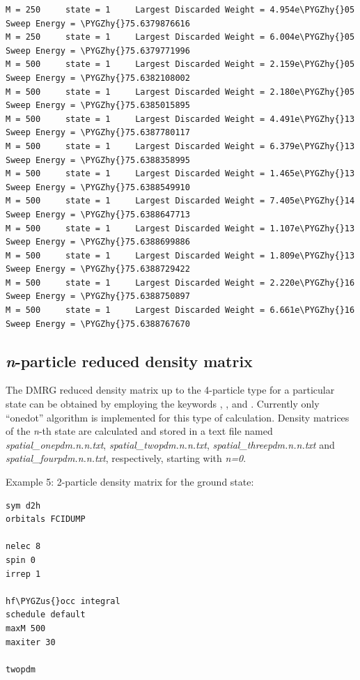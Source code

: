 \documentclass[letterpaper,10pt,english]{sphinxmanual}
\def\PYGZus{\char`\_}
\def\PYGZhy{\char`\-}
\begin{document}
\begin{Verbatim}[commandchars=\\\{\}]
M = 250     state = 1     Largest Discarded Weight = 4.954e\PYGZhy{}05  Sweep Energy = \PYGZhy{}75.6379876616
M = 250     state = 1     Largest Discarded Weight = 6.004e\PYGZhy{}05  Sweep Energy = \PYGZhy{}75.6379771996
M = 500     state = 1     Largest Discarded Weight = 2.159e\PYGZhy{}05  Sweep Energy = \PYGZhy{}75.6382108002
M = 500     state = 1     Largest Discarded Weight = 2.180e\PYGZhy{}05  Sweep Energy = \PYGZhy{}75.6385015895
M = 500     state = 1     Largest Discarded Weight = 4.491e\PYGZhy{}13  Sweep Energy = \PYGZhy{}75.6387780117
M = 500     state = 1     Largest Discarded Weight = 6.379e\PYGZhy{}13  Sweep Energy = \PYGZhy{}75.6388358995
M = 500     state = 1     Largest Discarded Weight = 1.465e\PYGZhy{}13  Sweep Energy = \PYGZhy{}75.6388549910
M = 500     state = 1     Largest Discarded Weight = 7.405e\PYGZhy{}14  Sweep Energy = \PYGZhy{}75.6388647713
M = 500     state = 1     Largest Discarded Weight = 1.107e\PYGZhy{}13  Sweep Energy = \PYGZhy{}75.6388699886
M = 500     state = 1     Largest Discarded Weight = 1.809e\PYGZhy{}13  Sweep Energy = \PYGZhy{}75.6388729422
M = 500     state = 1     Largest Discarded Weight = 2.220e\PYGZhy{}16  Sweep Energy = \PYGZhy{}75.6388750897
M = 500     state = 1     Largest Discarded Weight = 6.661e\PYGZhy{}16  Sweep Energy = \PYGZhy{}75.6388767670
\end{Verbatim}


\subsection{\emph{n}-particle reduced density matrix}
\label{examples:n-particle-reduced-density-matrix}
The DMRG reduced density matrix up to the 4-particle type for a particular state can be obtained
by employing the keywords , ,  and .
Currently only ``onedot'' algorithm is implemented for this type of calculation.
Density matrices of the \emph{n}-th state are calculated and stored in a text file named \emph{spatial\_onepdm.n.n.txt}, \emph{spatial\_twopdm.n.n.txt},
\emph{spatial\_threepdm.n.n.txt} and \emph{spatial\_fourpdm.n.n.txt}, respectively, starting with \emph{n=0}.

Example 5: 2-particle density matrix for the ground state:

\begin{Verbatim}[commandchars=\\\{\}]
sym d2h
orbitals FCIDUMP

nelec 8
spin 0
irrep 1

hf\PYGZus{}occ integral
schedule default
maxM 500
maxiter 30

twopdm
\end{Verbatim}
\end{document}
